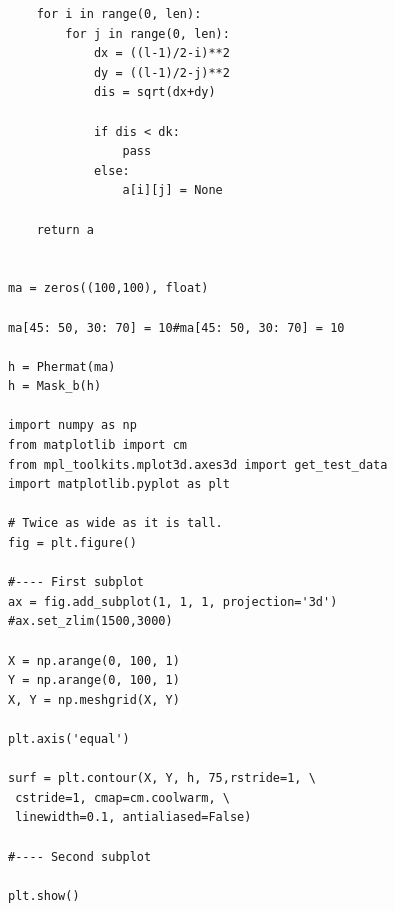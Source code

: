 \documentclass[pdftex,12pt,a4paper]{article}
\begin{document}
\begin{lstlisting}
    for i in range(0, len):
        for j in range(0, len):
            dx = ((l-1)/2-i)**2
            dy = ((l-1)/2-j)**2
            dis = sqrt(dx+dy)
            
            if dis < dk:
                pass
            else:
                a[i][j] = None
                
    return a    
    
    
ma = zeros((100,100), float)

ma[45: 50, 30: 70] = 10#ma[45: 50, 30: 70] = 10
        
h = Phermat(ma)
h = Mask_b(h)

import numpy as np
from matplotlib import cm
from mpl_toolkits.mplot3d.axes3d import get_test_data
import matplotlib.pyplot as plt

# Twice as wide as it is tall.
fig = plt.figure()

#---- First subplot
ax = fig.add_subplot(1, 1, 1, projection='3d')
#ax.set_zlim(1500,3000)

X = np.arange(0, 100, 1)
Y = np.arange(0, 100, 1)
X, Y = np.meshgrid(X, Y)

plt.axis('equal')

surf = plt.contour(X, Y, h, 75,rstride=1, \
 cstride=1, cmap=cm.coolwarm, \
 linewidth=0.1, antialiased=False)

#---- Second subplot

plt.show()




\end{lstlisting}
\end{document}
